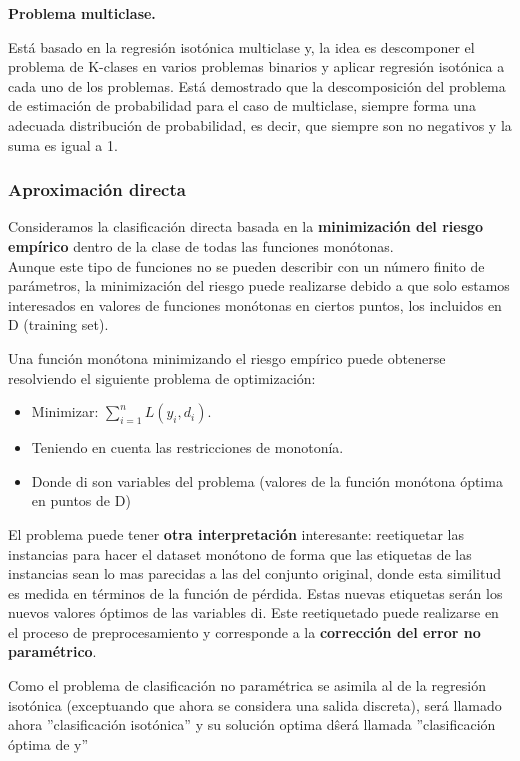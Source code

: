 \textbf{Problema multiclase.}

Está basado en la regresión isotónica multiclase y, la idea es descomponer el problema de K-clases en varios problemas binarios
y aplicar regresión isotónica a cada uno de los problemas.
Está demostrado que la descomposición del problema de estimación de 
probabilidad para el caso de multiclase, siempre forma una adecuada 
distribución de probabilidad, es decir, que siempre son no negativos
y la suma es igual a 1.


\subsubsection{Aproximación directa}

Consideramos la clasificación directa basada en la\textbf{ minimización del riesgo 
empírico} dentro de la clase de todas las funciones monótonas.\\
Aunque este tipo de funciones no se pueden describir con un número 
finito de parámetros, la minimización del riesgo puede realizarse debido a 
que solo estamos interesados en valores de funciones monótonas en ciertos
puntos, los incluidos en D (training set).

Una función monótona minimizando el riesgo empírico puede obtenerse resolviendo
el siguiente problema de optimización:

\begin{itemize}
	\item Minimizar: $\sum_{i=1}^n{L(y_i,d_i)}$.
	\item Teniendo en cuenta las restricciones de monotonía.
	\item Donde di son variables del problema (valores de la función monótona óptima
	en puntos de D)
\end{itemize}

El problema puede tener \textbf{otra interpretación} interesante: reetiquetar las
instancias para hacer el dataset monótono de forma que las etiquetas de las
instancias sean lo mas parecidas a las del conjunto original, donde esta 
similitud es medida en términos de la función de pérdida. Estas nuevas
etiquetas serán los nuevos valores óptimos de las variables di. 
Este reetiquetado puede realizarse en el proceso de preprocesamiento
y corresponde a la \textbf{corrección del error no paramétrico}.

Como el problema de clasificación no paramétrica se asimila al de la regresión
isotónica (exceptuando que ahora se considera una salida discreta), será llamado
ahora ''clasificación isotónica'' y su solución optima d\^ será llamada
''clasificación óptima de y''




\newpage

